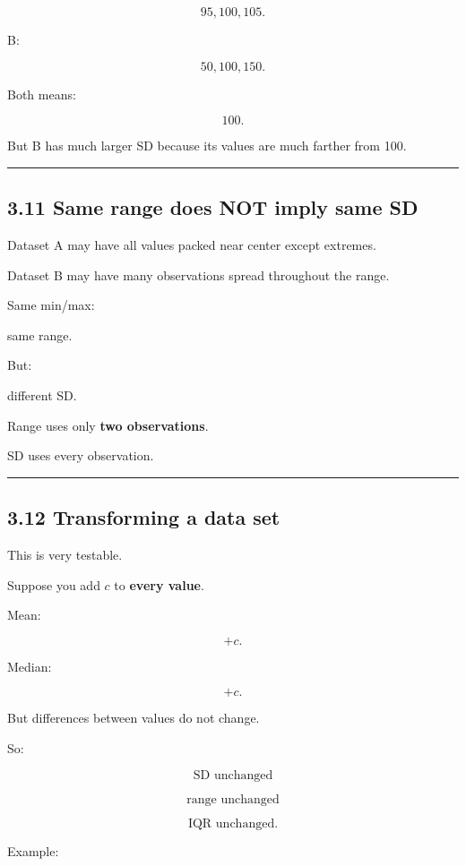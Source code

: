 \documentclass[
]{article}
\begin{document}
\[
95,100,105.
\]

B:

\[
50,100,150.
\]

Both means:

\[
100.
\]

But B has much larger SD because its values are much farther from 100.

\begin{center}\rule{0.5\linewidth}{0.5pt}\end{center}

\subsection{3.11 Same range does NOT imply same
SD}\label{same-range-does-not-imply-same-sd}

Dataset A may have all values packed near center except extremes.

Dataset B may have many observations spread throughout the range.

Same min/max:

same range.

But:

different SD.

Range uses only \textbf{two observations}.

SD uses every observation.

\begin{center}\rule{0.5\linewidth}{0.5pt}\end{center}

\subsection{3.12 Transforming a data set}\label{transforming-a-data-set}

This is very testable.

Suppose you add \(c\) to \textbf{every value}.

Mean:

\[
+c.
\]

Median:

\[
+c.
\]

But differences between values do not change.

So:

\[
\boxed{\text{SD unchanged}}
\]

\[
\boxed{\text{range unchanged}}
\]

\[
\boxed{\text{IQR unchanged}}.
\]

Example:
\end{document}

